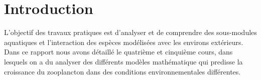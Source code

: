 \section{Introduction}

\par{
L'objectif des travaux pratiques est d'analyser et de comprendre des sous-modules
aquatiques et l'interaction des espèces modélisées avec les environs extérieurs.
Dans ce rapport nous avons détaillé le quatrième et cinquième cours, dans lesquels
on a du analyser des différents modèles mathématique qui predisse la croissance du
zooplancton dans des conditions environnementales différentes.
}
